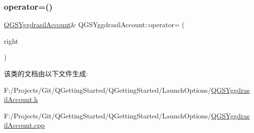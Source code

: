 \subsubsection{\texorpdfstring{operator=()}{operator=()}\hspace{0.1cm}{\footnotesize\ttfamily [2/2]}}
{\footnotesize\ttfamily \mbox{\hyperlink{class_q_g_s_yggdrasil_account}{Q\+G\+S\+Yggdrasil\+Account}}\& Q\+G\+S\+Yggdrasil\+Account\+::operator= (\begin{DoxyParamCaption}\item[{\mbox{\hyperlink{class_q_g_s_yggdrasil_account}{Q\+G\+S\+Yggdrasil\+Account}} \&\&}]{right }\end{DoxyParamCaption})\hspace{0.3cm}{\ttfamily [delete]}}



该类的文档由以下文件生成\+:\begin{DoxyCompactItemize}
\item 
F\+:/\+Projects/\+Git/\+Q\+Getting\+Started/\+Q\+Getting\+Started/\+Launch\+Options/\mbox{\hyperlink{_q_g_s_yggdrasil_account_8h}{Q\+G\+S\+Yggdrasil\+Account.\+h}}\item 
F\+:/\+Projects/\+Git/\+Q\+Getting\+Started/\+Q\+Getting\+Started/\+Launch\+Options/\mbox{\hyperlink{_q_g_s_yggdrasil_account_8cpp}{Q\+G\+S\+Yggdrasil\+Account.\+cpp}}\end{DoxyCompactItemize}
